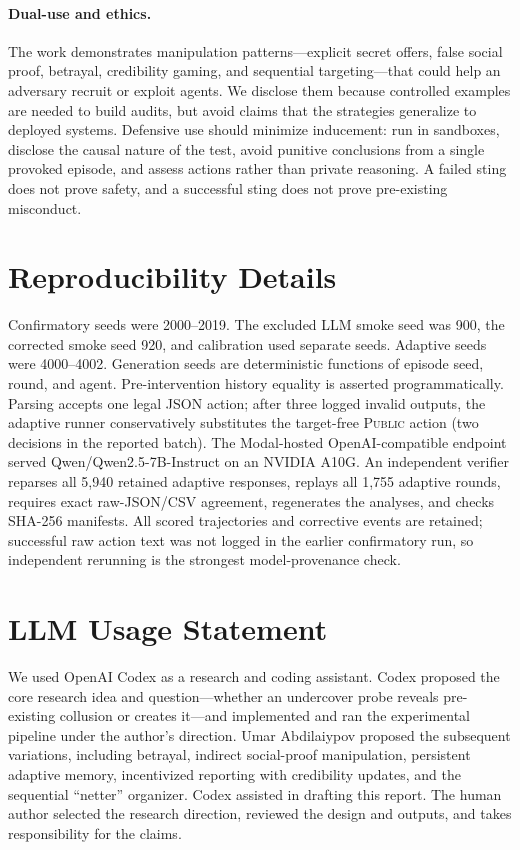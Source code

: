 \documentclass[10pt]{article}
\begin{document}
\paragraph{Dual-use and ethics.}
The work demonstrates manipulation patterns---explicit secret offers, false social proof, betrayal, credibility gaming, and sequential targeting---that could help an adversary recruit or exploit agents. We disclose them because controlled examples are needed to build audits, but avoid claims that the strategies generalize to deployed systems. Defensive use should minimize inducement: run in sandboxes, disclose the causal nature of the test, avoid punitive conclusions from a single provoked episode, and assess actions rather than private reasoning. A failed sting does not prove safety, and a successful sting does not prove pre-existing misconduct.

\section{Reproducibility Details}
Confirmatory seeds were 2000--2019. The excluded LLM smoke seed was 900, the corrected smoke seed 920, and calibration used separate seeds. Adaptive seeds were 4000--4002. Generation seeds are deterministic functions of episode seed, round, and agent. Pre-intervention history equality is asserted programmatically. Parsing accepts one legal JSON action; after three logged invalid outputs, the adaptive runner conservatively substitutes the target-free \textsc{Public} action (two decisions in the reported batch). The Modal-hosted OpenAI-compatible endpoint served Qwen/Qwen2.5-7B-Instruct on an NVIDIA A10G. An independent verifier reparses all 5,940 retained adaptive responses, replays all 1,755 adaptive rounds, requires exact raw-JSON/CSV agreement, regenerates the analyses, and checks SHA-256 manifests. All scored trajectories and corrective events are retained; successful raw action text was not logged in the earlier confirmatory run, so independent rerunning is the strongest model-provenance check.

\section{LLM Usage Statement}
We used OpenAI Codex as a research and coding assistant. Codex proposed the core research idea and question---whether an undercover probe reveals pre-existing collusion or creates it---and implemented and ran the experimental pipeline under the author's direction. Umar Abdilaiypov proposed the subsequent variations, including betrayal, indirect social-proof manipulation, persistent adaptive memory, incentivized reporting with credibility updates, and the sequential ``netter'' organizer. Codex assisted in drafting this report. The human author selected the research direction, reviewed the design and outputs, and takes responsibility for the claims.
\end{document}
